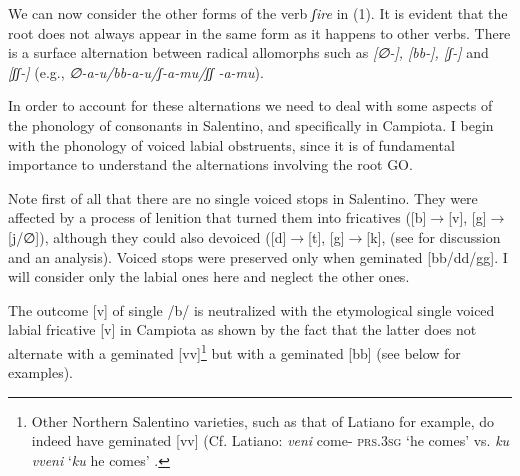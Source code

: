 \documentclass[output=paper]{langscibook}
\begin{document}
We can now consider the other forms of the verb \textit{ʃire}  in  (1).  It is evident that the root does not always appear in the same form as it happens to other verbs.  There is a surface alternation between radical allomorphs such as  \textit{[∅-], [bb-], [ʃ-]}  and  \textit{[ʃʃ-]}  (e.g.,  \textit{∅-a-u/bb-a-u/ʃ-a-mu/ʃʃ -a-mu}).

In order to account for these alternations we need to deal with some aspects of the phonology of consonants in Salentino, and specifically in Campiota.   I begin with the phonology of voiced labial obstruents, since it is of fundamental importance to understand the alternations involving the root GO.

Note first of all that there are no single voiced stops in Salentino.  They were affected by a process of lenition that turned them into fricatives ([b]$\rightarrow$[v], [g]$\rightarrow$ [j/∅]), although they could also devoiced ([d]$\rightarrow$[t], [g]$\rightarrow$[k], (see \citealt{calabrese1987a} for discussion and an analysis).  Voiced stops were preserved only when geminated [bb/dd/gg]. I will consider only the labial ones here and neglect the other ones.

The outcome [v] of single /b/ is neutralized with the etymological single voiced labial fricative [v] in Campiota as shown by the fact that  the latter does not alternate with a geminated [vv]\footnote{Other Northern Salentino varieties, such as that of Latiano for example, do indeed have geminated [vv] (Cf. Latiano: \textit{veni} come- \textsc{prs}.\textsc{3sg} ‘he comes’ vs. \textit{ku vveni} ‘\textit{ku} he comes’ \citep{urgese2003a}.}  but with a geminated [bb] (see below for examples).
\end{document}
